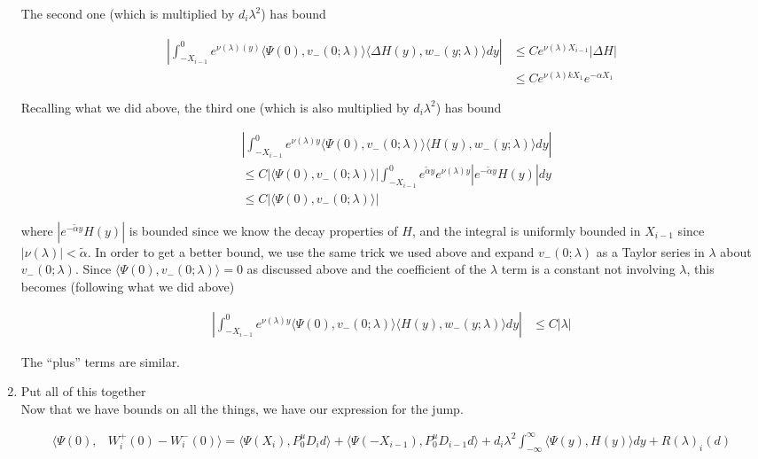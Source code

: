\documentclass[12pt]{article}
\begin{document}
\begin{enumerate}
The second one (which is multiplied by $d_i \lambda^2$) has bound

\begin{align*}
\left| \int_{-X_{i-1}}^0
e^{\nu(\lambda)(y)} \langle \Psi(0), v_-(0; \lambda) \rangle \langle \Delta H(y), w_-(y; \lambda) \rangle dy \right| 
&\leq C e^{\nu(\lambda)X_{i-1}} |\Delta H| \\
&\leq C e^{\nu(\lambda)k X_1} e^{-\alpha X_1}
\end{align*}

Recalling what we did above, the third one (which is also multiplied by $d_i \lambda^2$) has bound

\begin{align*}
&\left| \int_{-X_{i-1}}^0 e^{\nu(\lambda)y} \langle \Psi(0), v_-(0; \lambda) \rangle
\langle H(y), w_-(y; \lambda) \rangle dy \right| \\
&\leq C |\langle \Psi(0), v_-(0; \lambda) \rangle| \int_{-X_{i-1}}^0 e^{\tilde{\alpha}y}e^{\nu(\lambda)y} | e^{-\tilde{\alpha} y} H(y)|dy\\
&\leq C |\langle \Psi(0), v_-(0; \lambda) \rangle|
\end{align*}

where $|e^{-\tilde{\alpha} y} H(y)|$ is bounded since we know the decay properties of $H$, and the integral is uniformly bounded in $X_{i-1}$ since $|\nu(\lambda)| < \tilde{\alpha}$. In order to get a better bound, we use the same trick we used above and expand $v_-(0; \lambda)$ as a Taylor series in $\lambda$ about $v_-(0; \lambda)$. Since $\langle \Psi(0), v_-(0; \lambda) \rangle = 0$ as discussed above and the coefficient of the $\lambda$ term is a constant not involving $\lambda$, this becomes (following what we did above)

\begin{align*}
\left| \int_{-X_{i-1}}^0 e^{\nu(\lambda)y} \langle \Psi(0), v_-(0; \lambda) \rangle
\langle H(y), w_-(y; \lambda) \rangle dy \right| 
&\leq C |\lambda| 
\end{align*}

The ``plus'' terms are similar.

\item Put all of this together\\

Now that we have bounds on all the things, we have our expression for the jump.

\begin{align*}
\langle \Psi(0), &W_i^+(0) - W_i^-(0) \rangle = 
\langle \Psi(X_i), P^u_0 D_i d \rangle + \langle \Psi(-X_{i-1}), P^u_0 D_{i-1} d \rangle + d_i \lambda^2 \int_{-\infty}^\infty \langle \Psi(y), H(y) \rangle dy + R(\lambda)_i(d)
\end{align*}


\end{enumerate}
\end{document}
